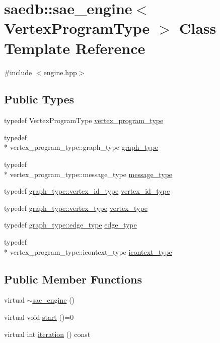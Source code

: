 \hypertarget{classsaedb_1_1sae__engine}{\section{saedb\-:\-:sae\-\_\-engine$<$ Vertex\-Program\-Type $>$ Class Template Reference}
\label{d9/d3c/classsaedb_1_1sae__engine}
}


{\ttfamily \#include $<$engine.\-hpp$>$}

\subsection*{Public Types}
\begin{DoxyCompactItemize}
\item 
typedef Vertex\-Program\-Type \hyperlink{classsaedb_1_1sae__engine_a4ba1ac425ce1e4635c362d0bd7a8a027}{vertex\-\_\-program\-\_\-type}
\item 
typedef \\*
vertex\-\_\-program\-\_\-type\-::graph\-\_\-type \hyperlink{classsaedb_1_1sae__engine_a23370233de451071df13960fe21fc02a}{graph\-\_\-type}
\item 
typedef \\*
vertex\-\_\-program\-\_\-type\-::message\-\_\-type \hyperlink{classsaedb_1_1sae__engine_a58d400cce9eb7d2940ba43724d60f6af}{message\-\_\-type}
\item 
typedef \hyperlink{classsaedb_1_1sae__graph_a2f9a7bf2db556689f1cd9de9562ff41f}{graph\-\_\-type\-::vertex\-\_\-id\-\_\-type} \hyperlink{classsaedb_1_1sae__engine_a50de6c2ffe1f5c800cef952d84b2e66b}{vertex\-\_\-id\-\_\-type}
\item 
typedef \hyperlink{structsaedb_1_1sae__graph_1_1vertex__type}{graph\-\_\-type\-::vertex\-\_\-type} \hyperlink{classsaedb_1_1sae__engine_aa4841d2e9bb3be955dcb3a25e0d88e94}{vertex\-\_\-type}
\item 
typedef \hyperlink{classsaedb_1_1sae__graph_1_1edge__type}{graph\-\_\-type\-::edge\-\_\-type} \hyperlink{classsaedb_1_1sae__engine_a0e500fe959827d10ef1164ae6ee3563f}{edge\-\_\-type}
\item 
typedef \\*
vertex\-\_\-program\-\_\-type\-::icontext\-\_\-type \hyperlink{classsaedb_1_1sae__engine_a57877f66118a797fff3915a78ee42f22}{icontext\-\_\-type}
\end{DoxyCompactItemize}
\subsection*{Public Member Functions}
\begin{DoxyCompactItemize}
\item 
virtual \hyperlink{classsaedb_1_1sae__engine_aba8d40809e5030b304b4ddf69dac5b5f}{$\sim$sae\-\_\-engine} ()
\item 
virtual void \hyperlink{classsaedb_1_1sae__engine_aa4e0b1b7ab5dcdf3baa48ae0d798b30b}{start} ()=0
\item 
virtual int \hyperlink{classsaedb_1_1sae__engine_a6ec4a6ce61f1e8b2fcccb46031613ae9}{iteration} () const 
\end{DoxyCompactItemize}


